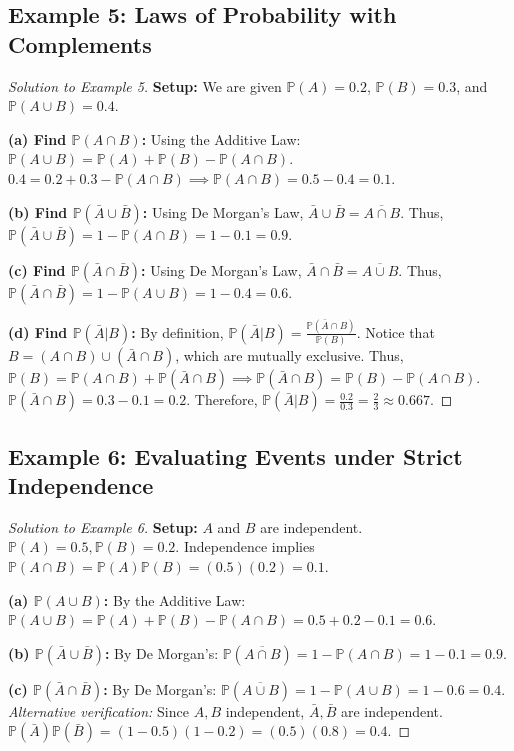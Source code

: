 \documentclass[12pt, a4paper]{article}
\theoremstyle{definition}
\theoremstyle{remark}
\newcommand{\Prob}{\mathbb{P}}
\newcommand{\1}{\mathbf{1}}
\begin{document}
\subsection*{Example 5: Laws of Probability with Complements}
\begin{proof}[Solution to Example 5]
\textbf{Setup:} We are given $\Prob(A) = 0.2$, $\Prob(B) = 0.3$, and $\Prob(A \cup B) = 0.4$.

\textbf{(a) Find $\Prob(A \cap B)$:}
Using the Additive Law: $\Prob(A \cup B) = \Prob(A) + \Prob(B) - \Prob(A \cap B)$.
$0.4 = 0.2 + 0.3 - \Prob(A \cap B) \implies \Prob(A \cap B) = 0.5 - 0.4 = 0.1$.

\textbf{(b) Find $\Prob(\bar{A} \cup \bar{B})$:}
Using De Morgan's Law, $\bar{A} \cup \bar{B} = \overline{A \cap B}$.
Thus, $\Prob(\bar{A} \cup \bar{B}) = 1 - \Prob(A \cap B) = 1 - 0.1 = 0.9$.

\textbf{(c) Find $\Prob(\bar{A} \cap \bar{B})$:}
Using De Morgan's Law, $\bar{A} \cap \bar{B} = \overline{A \cup B}$.
Thus, $\Prob(\bar{A} \cap \bar{B}) = 1 - \Prob(A \cup B) = 1 - 0.4 = 0.6$.

\textbf{(d) Find $\Prob(\bar{A} | B)$:}
By definition, $\Prob(\bar{A} | B) = \frac{\Prob(\bar{A} \cap B)}{\Prob(B)}$.
Notice that $B = (A \cap B) \cup (\bar{A} \cap B)$, which are mutually exclusive.
Thus, $\Prob(B) = \Prob(A \cap B) + \Prob(\bar{A} \cap B) \implies \Prob(\bar{A} \cap B) = \Prob(B) - \Prob(A \cap B)$.
$\Prob(\bar{A} \cap B) = 0.3 - 0.1 = 0.2$.
Therefore, $\Prob(\bar{A} | B) = \frac{0.2}{0.3} = \frac{2}{3} \approx 0.667$.
\end{proof}

\subsection*{Example 6: Evaluating Events under Strict Independence}
\begin{proof}[Solution to Example 6]
\textbf{Setup:} $A$ and $B$ are independent. $\Prob(A) = 0.5, \Prob(B) = 0.2$. Independence implies $\Prob(A \cap B) = \Prob(A)\Prob(B) = (0.5)(0.2) = 0.1$.

\textbf{(a) $\Prob(A \cup B)$:} 
By the Additive Law: $\Prob(A \cup B) = \Prob(A) + \Prob(B) - \Prob(A \cap B) = 0.5 + 0.2 - 0.1 = 0.6$.

\textbf{(b) $\Prob(\bar{A} \cup \bar{B})$:} 
By De Morgan's: $\Prob(\overline{A \cap B}) = 1 - \Prob(A \cap B) = 1 - 0.1 = 0.9$.

\textbf{(c) $\Prob(\bar{A} \cap \bar{B})$:} 
By De Morgan's: $\Prob(\overline{A \cup B}) = 1 - \Prob(A \cup B) = 1 - 0.6 = 0.4$.
\textit{Alternative verification:} Since $A, B$ independent, $\bar{A}, \bar{B}$ are independent. $\Prob(\bar{A})\Prob(\bar{B}) = (1-0.5)(1-0.2) = (0.5)(0.8) = 0.4$.
\end{proof}
\end{document}

